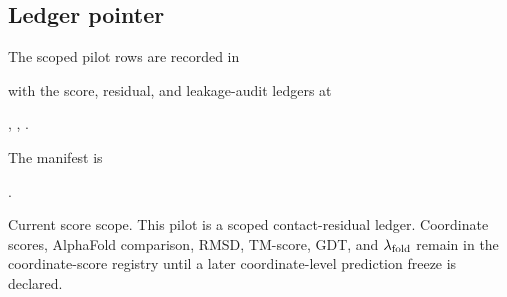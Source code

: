 \subsection{Ledger pointer}

The scoped pilot rows are recorded in
\begin{center}
\small
{}
\end{center}
with the score, residual, and leakage-audit ledgers at
\begin{center}
\small
{},\quad
{},\quad
{}.
\end{center}
The manifest is
\begin{center}
\small
{}.
\end{center}
Current score scope. This pilot is a scoped contact-residual ledger. Coordinate scores, AlphaFold comparison, RMSD, TM-score, GDT, and $\lambda_{\rm fold}$ remain in the coordinate-score registry until a later coordinate-level prediction freeze is declared.
